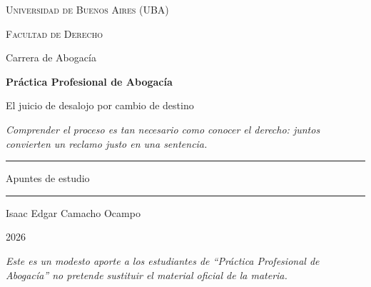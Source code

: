 \documentclass[12pt,oneside]{book}
\newcommand{\universidad}{Universidad de Buenos Aires (UBA)}
\newcommand{\facultad}{Facultad de Derecho}
\newcommand{\carrera}{Carrera de Abogacía}
\newcommand{\materia}{Práctica Profesional de Abogacía}
\newcommand{\titulo}{El juicio de desalojo por cambio de destino}
\newcommand{\autor}{Isaac Edgar Camacho Ocampo}
\newcommand{\anio}{2026}
\begin{document}
\begin{titlepage}

\thispagestyle{empty}

\begin{center}

\vspace*{1cm}

{\large \textsc{\universidad}}

\vspace{0.2cm}

{\large \textsc{\facultad}}

\vspace{0.2cm}

{\large \carrera}

\vspace{3cm}

{\Huge \textbf{\materia}}

\vspace{1cm}

{\LARGE \titulo}

\vspace{0.8cm}

\textit{Comprender el proceso es tan necesario como conocer el derecho: juntos convierten un reclamo justo en una sentencia.}

\vspace{1.2cm}

\rule{0.70\textwidth}{0.5pt}

\vspace{0.5cm}

{\large Apuntes de estudio}

\vspace{0.5cm}

\rule{0.70\textwidth}{0.5pt}

\vfill

{\large \autor}

\vspace{0.3cm}

{\large \anio}

\end{center}

\vfill

\begin{flushleft}
\textit{Este es un modesto aporte a los estudiantes de ``Práctica Profesional de Abogacía'' no pretende sustituir el material oficial de la materia.}
\end{flushleft}

\end{titlepage}
\end{document}
